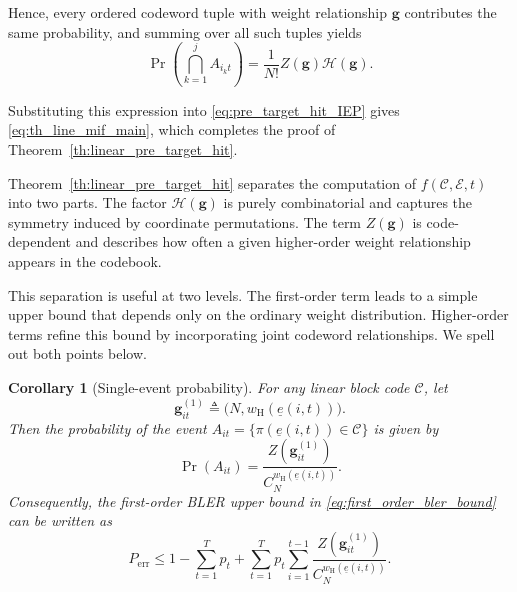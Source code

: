 \documentclass[letterpaper,draftclsnofoot,onecolumn]{IEEEtran}
\newtheorem{corollary}{Corollary}
\begin{document}
Hence, every ordered codeword tuple with weight relationship $\mathbf{g}$ contributes the same probability, and summing over all such tuples yields
\begin{equation}
\Pr\!\left(\bigcap_{k=1}^{j}A_{i_k t}\right)
=
\frac{1}{N!}Z(\mathbf{g})\mathcal{H}(\mathbf{g}).
\end{equation}

Substituting this expression into \eqref{eq:pre_target_hit_IEP} gives \eqref{eq:th_line_mif_main}, which completes the proof of Theorem~\ref{th:linear_pre_target_hit}.

Theorem~\ref{th:linear_pre_target_hit} separates the computation of $f(\mathcal{C},\mathcal{E},t)$ into two parts. The factor $\mathcal{H}(\mathbf{g})$ is purely combinatorial and captures the symmetry induced by coordinate permutations. The term $Z(\mathbf{g})$ is code-dependent and describes how often a given higher-order weight relationship appears in the codebook.

This separation is useful at two levels. The first-order term leads to a simple upper bound that depends only on the ordinary weight distribution. Higher-order terms refine this bound by incorporating joint codeword relationships. We spell out both points below.

\begin{corollary}[Single-event probability]\label{coro:single_event_prob}
For any linear block code $\mathcal{C}$, let
\begin{equation}
\mathbf{g}_{it}^{(1)}
\triangleq
\bigl(N,w_{\mathrm{H}}(\underline{e}(i,t))\bigr).
\end{equation}
Then the probability of the event $A_{it}=\{\pi(\underline{e}(i,t))\in\mathcal{C}\}$ is given by
\begin{equation}\label{eq:single_event_prob}
\Pr(A_{it}) = \frac{Z(\mathbf{g}_{it}^{(1)})}{C_{N}^{w_{\mathrm{H}}(\underline{e}(i,t))}}.
\end{equation}
Consequently, the first-order BLER upper bound in \eqref{eq:first_order_bler_bound} can be written as
\begin{equation}\label{eq:first_order_bler_bound_weight}
P_{\mathrm{err}}
\le
1-\sum_{t=1}^{T}p_t + 
\sum_{t=1}^{T}p_t\sum_{i=1}^{t-1}
\frac{Z(\mathbf{g}_{it}^{(1)})}{C_{N}^{w_{\mathrm{H}}(\underline{e}(i,t))}}.
\end{equation}
\end{corollary}
\end{document}
